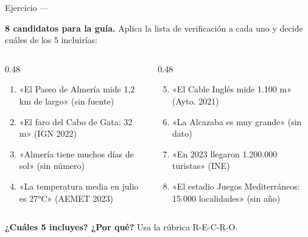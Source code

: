 \documentclass[aspectratio=169, 10pt, spanish]{beamer}
\begin{document}
\begin{frame}{Ejercicio — }
  \begin{analizarbox}
    \textbf{8 candidatos para la guía.} Aplica la lista de verificación a cada uno y decide cuáles de los 5 incluirías:

    \vspace{0.2cm}
    \begin{columns}[t]
      \begin{column}{0.48\textwidth}
        \begin{enumerate}
          \item «El Paseo de Almería mide 1,2 km de largo» (sin fuente)
          \item «El faro del Cabo de Gata: 32 m» (IGN 2022)
          \item «Almería tiene muchos días de sol» (sin número)
          \item «La temperatura media en julio es 27°C» (AEMET 2023)
        \end{enumerate}
      \end{column}
      \begin{column}{0.48\textwidth}
        \begin{enumerate}\setcounter{enumi}{4}
          \item «El Cable Inglés mide 1.100 m» (Ayto. 2021)
          \item «La Alcazaba es muy grande» (sin dato)
          \item «En 2023 llegaron 1.200.000 turistas» (INE)
          \item «El estadio Juegos Mediterráneos: 15.000 localidades» (sin año)
        \end{enumerate}
      \end{column}
    \end{columns}

    \vspace{0.2cm}
    \textbf{¿Cuáles 5 incluyes? ¿Por qué?} Usa la rúbrica R-E-C-R-O.
  \end{analizarbox}
\end{frame}
\end{document}
